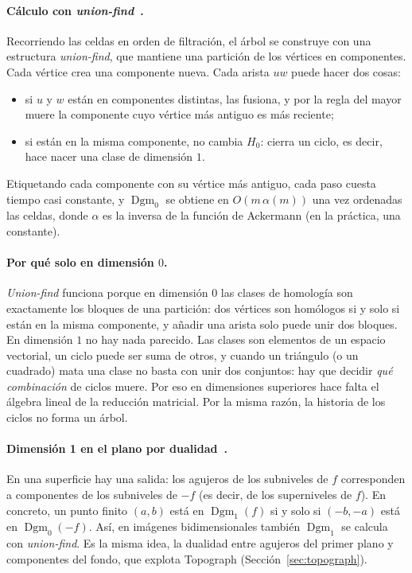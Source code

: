 \paragraph{Cálculo con \emph{union-find}~\cite[§VII.2]{edelsbrunner2010}.}
Recorriendo las celdas en orden de filtración, el árbol se construye con
una estructura \emph{union-find}, que mantiene una partición de los
vértices en componentes. Cada vértice crea una componente nueva. Cada
arista $uw$ puede hacer dos cosas:
\begin{itemize}
  \item si $u$ y $w$ están en componentes distintas, las fusiona, y por la
  regla del mayor muere la componente cuyo vértice más antiguo es más
  reciente;
  \item si están en la misma componente, no cambia $H_0$: cierra un ciclo,
  es decir, hace nacer una clase de dimensión $1$.
\end{itemize}
Etiquetando cada componente con su vértice más antiguo, cada paso cuesta
tiempo casi constante, y $\operatorname{Dgm}_0$ se obtiene en
$O(m\,\alpha(m))$ una vez ordenadas las celdas, donde $\alpha$ es la
inversa de la función de Ackermann (en la práctica, una constante).

\paragraph{Por qué solo en dimensión $0$.} \emph{Union-find} funciona
porque en dimensión $0$ las clases de homología son exactamente los
bloques de una partición: dos vértices son homólogos si y solo si están
en la misma componente, y añadir una arista solo puede unir dos bloques.
En dimensión $1$ no hay nada parecido. Las clases son elementos de un
espacio vectorial, un ciclo puede ser suma de otros, y cuando un
triángulo (o un cuadrado) mata una clase no basta con unir dos conjuntos:
hay que decidir \emph{qué combinación} de ciclos muere. Por eso en
dimensiones superiores hace falta el álgebra lineal de la reducción
matricial. Por la misma razón, la historia de los ciclos no forma un árbol.

\paragraph{Dimensión 1 en el plano por dualidad~\cite[§VII.2]{edelsbrunner2010}.}
En una superficie hay una salida: los agujeros de los subniveles de $f$
corresponden a componentes de los subniveles de $-f$ (es decir, de los
superniveles de $f$). En concreto, un punto finito $(a,b)$ está en
$\operatorname{Dgm}_1(f)$ si y solo si $(-b,-a)$ está en
$\operatorname{Dgm}_0(-f)$. Así, en imágenes bidimensionales también
$\operatorname{Dgm}_1$ se calcula con \emph{union-find}. Es la misma idea,
la dualidad entre agujeros del primer plano y componentes del fondo, que
explota Topograph (Sección~\ref{sec:topograph}).


